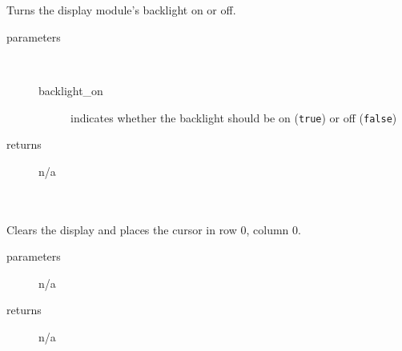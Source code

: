 \begin{itemize}
{             \\ \\
                Turns the display module's backlight on or off.
                \begin{description}
                    \item[parameters] \
                    \begin{description}
                        \item[backlight\_on] indicates whether the backlight should be on (\lstinline{true}) or off (\lstinline{false})
                    \end{description}
                    \item[returns] n/a
                \end{description}

             \\ \\
                Clears the display and places the cursor in row 0, column 0.
                \begin{description}
                    \item[parameters] n/a
                    \item[returns] n/a
                \end{description}
        }{}

    \end{itemize}
